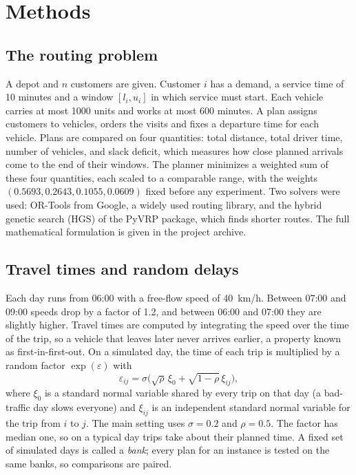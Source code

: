 \documentclass[12pt,letterpaper]{article}
\begin{document}
\section{Methods}

\subsection{The routing problem}

A depot and $n$ customers are given. Customer $i$ has a demand, a service time of
10 minutes and a window $[l_i,u_i]$ in which service must start. Each vehicle
carries at most 1000 units and works at most 600 minutes. A plan assigns customers
to vehicles, orders the visits and fixes a departure time for each vehicle. Plans
are compared on four quantities: total distance, total driver time, number of
vehicles, and slack deficit, which measures how close planned arrivals come to the
end of their windows. The planner minimizes a weighted sum of these four
quantities, each scaled to a comparable range, with the weights
$(0.5693,0.2643,0.1055,0.0609)$ fixed before any experiment. Two solvers were used:
OR-Tools from Google\cite{ortools}, a widely used routing library, and the
hybrid genetic search (HGS) of the PyVRP package\cite{vidal2022,wouda2024}, which
finds shorter routes. The full mathematical formulation is given in the project
archive\cite{ali2026archive}.

\subsection{Travel times and random delays}

Each day runs from 06:00 with a free-flow speed of 40~km/h. Between 07:00 and 09:00
speeds drop by a factor of 1.2, and between 06:00 and 07:00 they are slightly higher.
Travel times are computed by integrating the speed over the time of the trip, so a
vehicle that leaves later never arrives earlier, a property known as
first-in-first-out\cite{ichoua2003,ghiani2014}. On a simulated day, the time of each trip is
multiplied by a random factor $\exp(\varepsilon)$ with
\begin{equation}
 \varepsilon_{ij}=\sigma\bigl(\sqrt{\rho}\,\xi_0+\sqrt{1-\rho}\,\xi_{ij}\bigr),
 \label{eq:noise}
\end{equation}
where $\xi_0$ is a standard normal variable shared by every trip on that day (a
bad-traffic day slows everyone) and $\xi_{ij}$ is an independent standard normal
variable for the trip from $i$ to $j$. The main setting uses $\sigma=0.2$ and
$\rho=0.5$. The factor has median one, so on a typical day trips take about their
planned time. A fixed set of simulated days is called a \emph{bank}; every plan for
an instance is tested on the same banks, so comparisons are paired.
\end{document}
